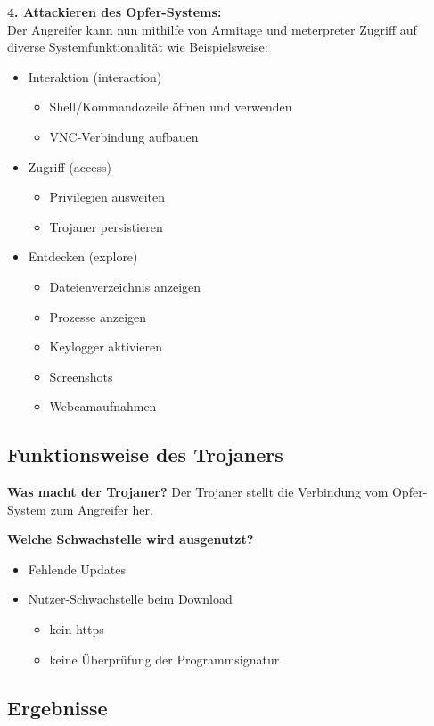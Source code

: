 \bigskip
\textbf{4. Attackieren des Opfer-Systems: } \hfill \\
Der Angreifer kann nun mithilfe von Armitage und meterpreter Zugriff auf diverse Systemfunktionalität wie Beispielsweise:
\begin{itemize}
	\item Interaktion (interaction)
		\begin{itemize}
			\item Shell/Kommandozeile öffnen und verwenden
			\item VNC-Verbindung aufbauen
		\end{itemize}
	\item Zugriff (access)
		\begin{itemize}
			\item Privilegien ausweiten
			\item Trojaner persistieren
		\end{itemize}
	\item Entdecken (explore)
		\begin{itemize}
			\item Dateienverzeichnis anzeigen
			\item Prozesse anzeigen
			\item Keylogger aktivieren
			\item Screenshots
			\item Webcamaufnahmen 
		\end{itemize}
\end{itemize}

\subsection{Funktionsweise des Trojaners}\label{sec:praktischeDurchfuehrung-funktionsweise}
\textbf{Was macht der Trojaner? }
Der Trojaner stellt die Verbindung vom Opfer-System zum Angreifer her.

\textbf{Welche Schwachstelle wird ausgenutzt? }
\begin{itemize}
	\item Fehlende Updates
	\item Nutzer-Schwachstelle beim Download
		\begin{itemize}
			\item kein https
			\item keine Überprüfung der Programmsignatur
		\end{itemize}
\end{itemize}

\subsection{Ergebnisse}\label{sec:praktischeDurchfuehrung-ergebnisse}

